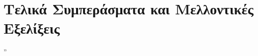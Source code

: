 \chapter{Τελικά Συμπεράσματα και Μελλοντικές Ε\-ξε\-λί\-ξεις} %
\label{chap:Chapter7}

\epigraph{” }{\textit{}}

